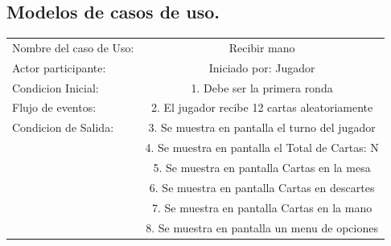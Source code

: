 \documentclass[60pt]{article}
\begin{document}
\subsection{Modelos de casos de uso.}\label{cap:modelos-casos-uso}
\begin{center}
    \begin{tabular}{ l | c  }
        
        Nombre del caso de Uso: & Recibir mano                                    \\
        Actor participante:     & Iniciado por: Jugador                           \\\hline
        Condicion Inicial:      & 1. Debe ser la primera ronda                    \\
        Flujo de eventos:       & 2. El jugador recibe 12 cartas aleatoriamente   \\\hline
        Condicion de Salida:    & 3. Se muestra en pantalla el turno del jugador  \\
                                & 4. Se muestra en pantalla el Total de Cartas: N \\
                                & 5. Se muestra en pantalla Cartas en la mesa     \\
                                & 6. Se muestra en pantalla Cartas en descartes   \\
                                & 7. Se muestra en pantalla Cartas en la mano     \\
                                & 8. Se muestra en pantalla un menu de opciones   \\ 
    \end{tabular} \\
\end{center}
\end{document}
